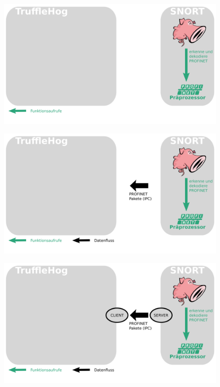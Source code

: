 \documentclass[18pt]{beamer}
\begin{document}
\begin{frame}
    \begin{figure}
    	\centering
    	\includegraphics[width=\textwidth]{./images/jan_4.png}
    \end{figure}
\end{frame}

\begin{frame}
    \begin{figure}
    	\centering
    	\includegraphics[width=\textwidth]{./images/jan_5.png}
    \end{figure}
\end{frame}

\begin{frame}
    \begin{figure}
    	\centering
    	\includegraphics[width=\textwidth]{./images/jan_6.png}
    \end{figure}
\end{frame}
\end{document}
